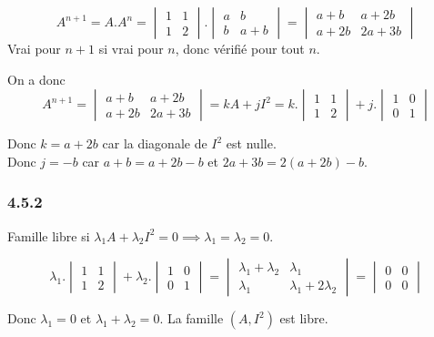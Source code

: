 \documentclass[]{book}
\theoremstyle{definition}
\begin{document}
$$A^{n+1} = A.A^n = \begin{vmatrix} 1 & 1 \\ 1 & 2 \end{vmatrix} . 
\begin{vmatrix} a & b \\ b & a+b \end{vmatrix} = 
\begin{vmatrix} a+b & a+2b \\ a+2b & 2a+3b \end{vmatrix}
$$
Vrai pour $n+1$ si vrai pour $n$, donc v\'erifi\'e pour tout $n$.

On a donc
$$A^{n+1} = \begin{vmatrix} a+b & a+2b \\ a+2b & 2a+3b \end{vmatrix} = kA + jI^2 = 
k . \begin{vmatrix} 1 & 1 \\ 1 & 2 \end{vmatrix} + 
j . \begin{vmatrix} 1 & 0 \\ 0 & 1 \end{vmatrix}
$$

Donc $k = a+2b$ car la diagonale de $I^2$ est nulle. \\
Donc $j = -b$ car $a+b = a+2b -b$ et $2a+3b = 2(a+2b)-b$.

\subsubsection*{4.5.2}
Famille libre si $\lambda_1 A + \lambda_2 I^2 = 0 \implies \lambda_1 = \lambda_2 = 0$.

$$\lambda_1.\begin{vmatrix} 1 & 1 \\ 1 & 2 \end{vmatrix} + 
\lambda_2.\begin{vmatrix} 1 & 0 \\ 0 & 1 \end{vmatrix} = 
\begin{vmatrix} \lambda_1+\lambda_2 & \lambda_1 \\ \lambda_1 & \lambda_1+2\lambda_2 \end{vmatrix} = \begin{vmatrix} 0 & 0 \\ 0 & 0 \end{vmatrix}
$$

Donc $\lambda_1 = 0$ et $\lambda_1 + \lambda_2 = 0$. La famille $(A,I^2)$ est libre.\\
\end{document}

